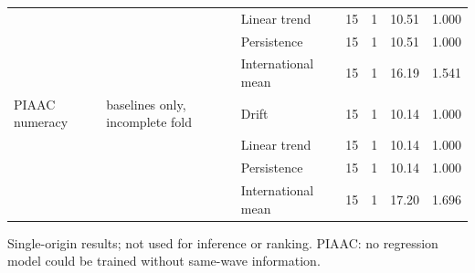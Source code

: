 {\begin{longtable}{lllrrrr}
 &  & Linear trend & 15 & 1 & 10.51 & 1.000 \\
 &  & Persistence & 15 & 1 & 10.51 & 1.000 \\
 &  & International mean & 15 & 1 & 16.19 & 1.541 \\
PIAAC numeracy & baselines only, incomplete fold & Drift & 15 & 1 & 10.14 & 1.000 \\
 &  & Linear trend & 15 & 1 & 10.14 & 1.000 \\
 &  & Persistence & 15 & 1 & 10.14 & 1.000 \\
 &  & International mean & 15 & 1 & 17.20 & 1.696 \\
\end{longtable}
{\scriptsize Single-origin results; not used for inference or ranking. PIAAC: no regression model could be trained without same-wave information.}
}
